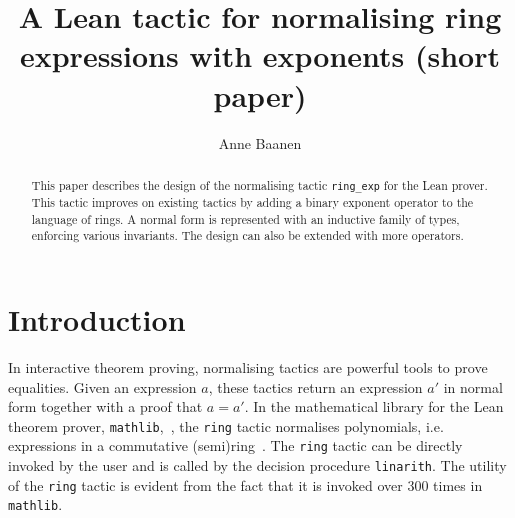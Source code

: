 \documentclass{llncs}
\title{A Lean tactic for normalising ring\\ expressions with exponents (short paper)}
\author{Anne Baanen}
\institute{Vrije Universiteit Amsterdam, Amsterdam, The Netherlands\\\email{t.baanen@vu.nl}}
\newcommand{\lean}[1]{\texttt{#1}\xspace} %
\newcommand{\ring}{\lean{ring}}
\newcommand{\ringexp}{\lean{ring\_exp}}
\begin{document}
\maketitle

\begin{abstract}
This paper describes the design of the normalising tactic \ringexp for the Lean prover.
This tactic improves on existing tactics by adding a binary exponent operator to the language of rings.
A normal form is represented with an inductive family of types, enforcing various invariants.
The design can also be extended with more operators.
\end{abstract}

\section{Introduction}

In interactive theorem proving, normalising tactics are powerful tools to prove equalities.
Given an expression $a$, these tactics return an expression $a'$ in normal form together with a proof that $a = a'$.
In the mathematical library for the Lean theorem prover, \texttt{mathlib},~\cite{lean-prover},
the \lean{ring} tactic normalises polynomials, i.e. expressions in a commutative (semi)ring~\cite{mathlib}.
The \ring tactic can be directly invoked by the user
and is called by the decision procedure \lean{linarith}.
The utility of the \lean{ring} tactic is evident from the fact that it is invoked over 300 times in \texttt{mathlib}. %
\end{document}
